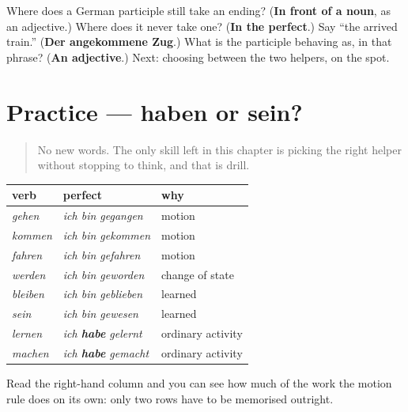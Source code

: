 \begin{tcolorbox}[breakable,colback=teal!4,colframe=teal!35!black,title={Before you move on}]
Where does a German participle still take an ending? (\textbf{In front of a noun}, as an adjective.) Where does it never take one? (\textbf{In the perfect}.) Say \textquotedblleft{}the arrived train.\textquotedblright{} (\textbf{Der angekommene Zug}.) What is the participle behaving as, in that phrase? (\textbf{An adjective}.) Next: choosing between the two helpers, on the spot.
\end{tcolorbox}
\section[Practice]{Practice — haben or sein?}

\label{lesson:GE-C16-haben-oder-sein}



\begin{quote}
No new words. The only skill left in this chapter is picking the right helper without stopping to think, and that is drill.
\end{quote}

\begin{grammarlens}[title={Grammar Lens: the whole family in one place}]
\noindent
\begin{tabularx}{\linewidth}{@{}>{\raggedright\arraybackslash}X>{\raggedright\arraybackslash}X>{\raggedright\arraybackslash}X@{}}
\toprule
\textbf{verb} & \textbf{perfect} & \textbf{why} \\
\midrule
\emph{gehen} & \emph{ich bin gegangen} & motion \\
\emph{kommen} & \emph{ich bin gekommen} & motion \\
\emph{fahren} & \emph{ich bin gefahren} & motion \\
\emph{werden} & \emph{ich bin geworden} & change of state \\
\emph{bleiben} & \emph{ich bin geblieben} & learned \\
\emph{sein} & \emph{ich bin gewesen} & learned \\
\emph{lernen} & \emph{ich \textbf{habe} gelernt} & ordinary activity \\
\emph{machen} & \emph{ich \textbf{habe} gemacht} & ordinary activity \\
\bottomrule
\end{tabularx}

Read the right-hand column and you can see how much of the work the motion rule does on its own: only two rows have to be memorised outright.
\end{grammarlens}

